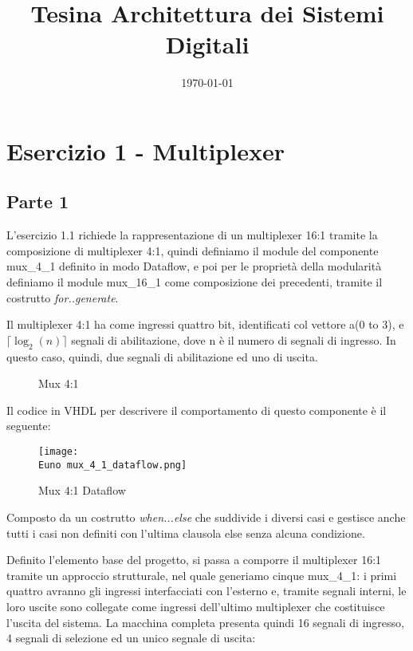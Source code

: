 \documentclass[12pt]{article}
\def \Euno {Allegati/Esercizio1/}
\begin{document}
\title{Tesina Architettura dei Sistemi Digitali}
\date{\today}
\tableofcontents
\newpage
\section{Esercizio 1 - Multiplexer}
\subsection{Parte 1}
L’esercizio 1.1 richiede la rappresentazione di un multiplexer 16:1 tramite la composizione di multiplexer 4:1, quindi definiamo il module del componente mux\_4\_1 definito in modo Dataflow, e poi per le proprietà della modularità definiamo il module mux\_16\_1 come composizione dei precedenti, tramite il costrutto \textit{for..generate}.


Il multiplexer 4:1 ha come ingressi quattro bit, identificati col vettore a(0 to 3), e $\lceil \log_{2}(n) \rceil$ segnali di abilitazione, dove n è il numero di segnali di ingresso. In questo caso, quindi, due segnali di abilitazione ed uno di uscita.
\begin{figure}[ht]
    \centering
    
    \caption{Mux 4:1}
\end{figure}

Il codice in VHDL per descrivere il comportamento di questo componente è il seguente:
\begin{figure}[ht]
    \centering
    \texttt{[image: \\Euno mux\_4\_1\_dataflow.png]}
    \caption{Mux 4:1 Dataflow}
\end{figure}

Composto da un costrutto \textit{when...else} che suddivide i diversi casi e gestisce anche tutti i casi non definiti con l’ultima clausola else senza alcuna condizione.

Definito l’elemento base del progetto, si passa a comporre il multiplexer 16:1 tramite un approccio strutturale, nel quale generiamo cinque mux\_4\_1: i primi quattro avranno gli ingressi interfacciati con l’esterno e, tramite segnali interni, le loro uscite sono collegate come ingressi dell’ultimo multiplexer che costituisce  l’uscita del sistema.
La macchina completa presenta quindi 16 segnali di ingresso, 4 segnali di selezione ed un unico segnale di uscita:
\end{document}
